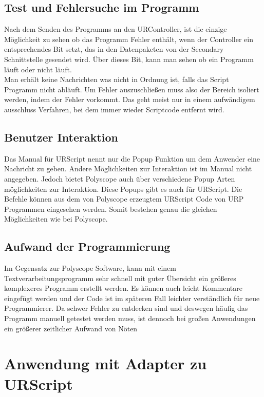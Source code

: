 \subsection{Test und Fehlersuche im Programm}
\label{ur_script_debuggen}

Nach dem Senden des Programms an den URController, ist die einzige Möglichkeit zu sehen ob das Programm Fehler enthält, wenn der Controller ein entsprechendes Bit setzt, das in den Datenpaketen von der Secondary Schnittstelle gesendet wird. Über dieses  Bit, kann man sehen ob ein Programm läuft oder nicht läuft. 
\\Man erhält keine Nachrichten was nicht in Ordnung ist, falls das Script Programm nicht abläuft. Um Fehler auszuschließen muss also der Bereich isoliert werden, indem der Fehler vorkommt. Das geht meist nur in einem aufwändigem ausschluss Verfahren, bei dem immer wieder Scriptcode entfernt wird.

\subsection{Benutzer Interaktion}
\label{ur_script_user_interaction}

Das Manual für URScript nennt nur die \ac{Popup} Funktion um dem Anwender eine Nachricht zu geben. Andere Möglichkeiten zur Interaktion ist im Manual nicht angegeben. Jedoch bietet Polyscope auch über verschiedene \ac{Popup} Arten möglichkeiten zur Interaktion. Diese \ac{Popup}s gibt es auch für URScript. Die Befehle können aus dem von Polyscope erzeugtem URScript Code von \ac{URP} Programmen eingesehen werden. Somit bestehen genau die gleichen Möglichkeiten wie bei Polyscope.

\subsection{Aufwand der Programmierung}
\label{ur_script_aufwand}

Im Gegensatz zur Polyscope Software, kann mit einem Textverarbeitungsprogramm sehr schnell mit guter Übersicht ein größeres komplexeres Programm erstellt werden. Es können auch leicht Kommentare eingefügt werden und der Code ist im späteren Fall leichter verständlich für neue Programmierer. Da schwer Fehler zu entdecken sind und deswegen häufig das Programm manuell getestet werden muss, ist dennoch bei großen Anwendungen ein größerer zeitlicher Aufwand von Nöten

\section{Anwendung mit Adapter zu URScript}
\label{sec:script_hoerherer_schicht_rel}

